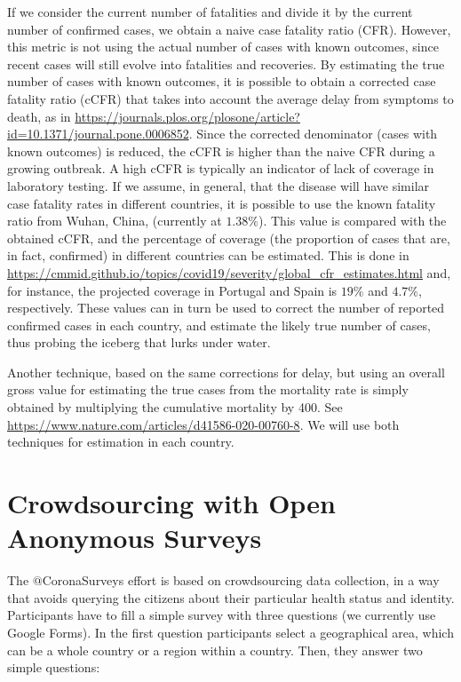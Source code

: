 \documentclass{article}
\begin{document}
If we consider the current number of fatalities and divide it by the current number of confirmed cases, we obtain a naive case fatality ratio (CFR). However, this metric is not using the actual number of cases with known outcomes, since recent cases will still evolve into fatalities and recoveries. By estimating the true number of cases with known outcomes, it is possible to obtain a corrected case fatality ratio (cCFR) that takes into account the average delay from symptoms to death, as in \url{https://journals.plos.org/plosone/article?id=10.1371/journal.pone.0006852}.
Since the corrected denominator (cases with known outcomes) is reduced, the cCFR is higher than the naive CFR during a growing outbreak. A high cCFR is typically an indicator of lack of coverage in laboratory testing. If we assume, in general, that the disease will have similar case fatality rates in different countries, it is possible to use the known fatality ratio from Wuhan, China, (currently at $1.38\%$). This value is compared with the obtained cCFR, and the percentage of coverage (the proportion of cases that are, in fact, confirmed) in different countries can be estimated. This is done in \url{https://cmmid.github.io/topics/covid19/severity/global_cfr_estimates.html} and, for instance, the projected coverage in Portugal and Spain is $19\%$ and $4.7\%$, respectively. These values can in turn be used to correct the number of reported confirmed cases in each country, and estimate the likely true number of cases, thus probing the iceberg that lurks under water.

Another technique, based on the same corrections for delay, but using an overall gross value for estimating the true cases from the mortality rate is simply obtained by multiplying the cumulative mortality by 400. See \url{https://www.nature.com/articles/d41586-020-00760-8}. We will use both techniques for estimation in each country.

\section{Crowdsourcing with Open Anonymous Surveys}

The $@$CoronaSurveys effort is based on crowdsourcing data collection, in a way that avoids querying the citizens about their particular health status and identity. Participants have to fill a simple survey with three questions (we currently use Google Forms). In the first question participants select a geographical area, which can be a whole country or a region within a country. Then, they answer two simple questions: 
\end{document}
